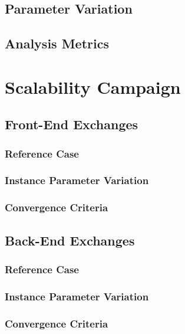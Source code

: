 \subsection{Parameter Variation}

\subsection{Analysis Metrics}

\section{Scalability Campaign}

\subsection{Front-End Exchanges}

\subsubsection{Reference Case}

\subsubsection{Instance Parameter Variation}

\subsubsection{Convergence Criteria}

\subsection{Back-End Exchanges}

\subsubsection{Reference Case}

\subsubsection{Instance Parameter Variation}

\subsubsection{Convergence Criteria}

